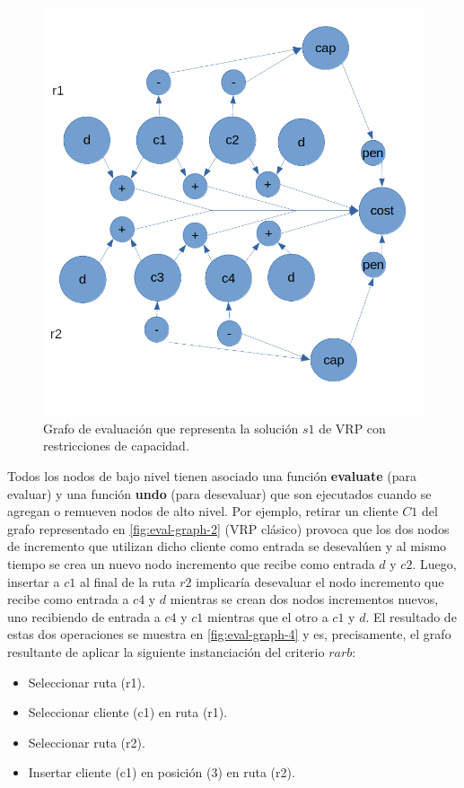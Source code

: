 \begin{figure}
	\centering
	\includegraphics[width=0.9\linewidth]{Graphics/eval-graph-3}
	\caption{Grafo de evaluación que representa la solución $s1$ de VRP con restricciones de capacidad.}
	\label{fig:eval-graph-3}
\end{figure}

Todos los nodos de bajo nivel tienen asociado una función \textbf{evaluate} (para evaluar) y una función \textbf{undo} (para desevaluar) que son ejecutados cuando se agregan o remueven nodos de alto nivel. Por ejemplo, retirar un cliente $C1$ del grafo representado en \ref{fig:eval-graph-2} (VRP clásico) provoca que los dos nodos de incremento que utilizan dicho cliente como entrada se desevalúen y al mismo tiempo se crea un nuevo nodo incremento que recibe como entrada $d$ y $c2$. Luego, insertar a $c1$ al final de la ruta $r2$ implicaría desevaluar el nodo incremento que recibe como entrada a $c4$ y $d$ mientras se crean dos nodos incrementos nuevos, uno recibiendo de entrada a $c4$ y $c1$ mientras que el otro a $c1$ y $d$. El resultado de estas dos operaciones se muestra en \ref{fig:eval-graph-4} y es, precisamente, el grafo resultante de aplicar la siguiente instanciación del criterio $rarb$:

\begin{itemize}
	\item Seleccionar ruta (r1).
	\item Seleccionar cliente (c1) en ruta (r1).
	\item Seleccionar ruta (r2).
	\item Insertar cliente (c1) en posición (3) en ruta (r2).
\end{itemize}

